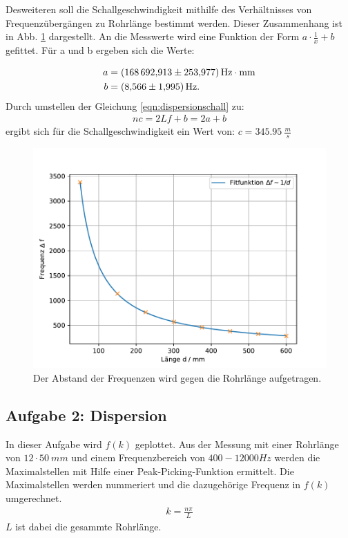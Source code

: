 \FloatBarrier
Desweiteren soll die Schallgeschwindigkeit mithilfe des Verhältnisses von Frequenzübergängen zu Rohrlänge bestimmt werden.
Dieser Zusammenhang ist in Abb. \ref{fig.1/x} dargestellt.
An die Messwerte wird eine Funktion der Form $a\cdot\frac{1}{x}+b$ gefittet.
Für a und b ergeben sich die Werte:

\begin{align*}
  a&=\SI{168692.913\pm253.977}{Hz \cdot mm}\\
  b&=\SI{8.566\pm1.995}{Hz}.\\
\end{align*}
Durch umstellen der Gleichung \ref{eqn:dispersionschall} zu:
\begin{align*}
  nc=2Lf+b=2a+b
\end{align*}
ergibt sich für die Schallgeschwindigkeit ein Wert von: $c = \SI{345.95}{\frac{m}{s}}$
\begin{figure}[h!]
  \centering
  \includegraphics[width=\textwidth]{geschi.pdf}
  \caption{Der Abstand der Frequenzen wird gegen die Rohrlänge aufgetragen.}
  \label{fig.1/x}
\end{figure}
\FloatBarrier

\subsection{Aufgabe 2: Dispersion}
\FloatBarrier
In dieser Aufgabe wird $f(k)$ geplottet.
Aus der Messung mit einer Rohrlänge von $12\cdot\SI{50}{mm}$ und einem Frequenzbereich von $400-12000\si{Hz}$ werden die Maximalstellen mit Hilfe einer Peak-Picking-Funktion ermittelt.
Die Maximalstellen werden nummeriert und die dazugehörige Frequenz in $f(k)$ umgerechnet.
\begin{align}
  k= \frac{n \pi}{L}
\end{align}
$L$ ist dabei die gesammte Rohrlänge.

